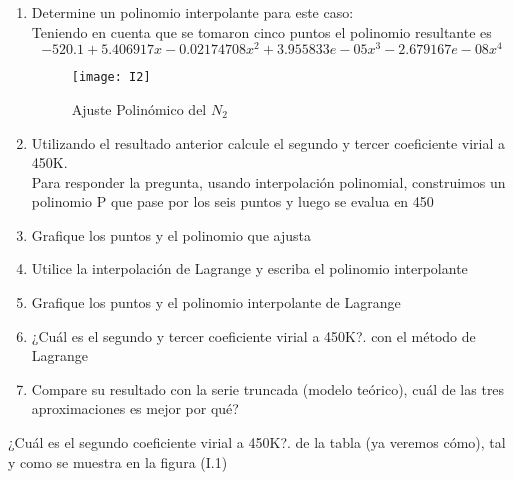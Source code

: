 \documentclass[12pt,letterpaper]{exam}
\begin{document}
\begin{enumerate}
\begin{enumerate}
	\item 
	Determine un polinomio interpolante para este caso:\\
	Teniendo en cuenta que se tomaron cinco puntos el polinomio resultante es
	\begin{equation}
	-520.1 + 5.406917x - 0.02174708x^{2} + 3.955833e-05x^{3} -  
	2.679167e-08x^{4} 
	\end{equation}
	\begin{center} 
		\begin{figure}[h]
			\centering%
			\texttt{[image: I2]}
			\caption{Ajuste Polinómico del $N_{2}$} 
		\end{figure}
	\end{center}
	\item
	Utilizando el resultado anterior calcule el segundo y tercer coeficiente virial a 450K.\\
	Para responder
	la pregunta, usando interpolación polinomial, construimos un
	polinomio P que pase por los seis puntos y luego se evalua en 450
	\item
	Grafique los puntos y el polinomio que ajusta
	\item
	Utilice la interpolación de Lagrange y escriba el polinomio interpolante 
	\item
	Grafique los puntos y el polinomio interpolante de Lagrange 
	\item
	¿Cuál es el segundo y tercer coeficiente virial a 450K?. con el método de Lagrange
	\item
	Compare su resultado con la serie truncada (modelo teórico), cuál de las tres aproximaciones es mejor por qué?
	
\end{enumerate}


¿Cuál es el segundo coeficiente virial a 450K?.  de la tabla (ya veremos
cómo), tal y como se muestra en la figura (I.1)
	
 
 
 
 

 
    
            
   
      
     
     	
 	 
  
  





 
 
 	
\end{enumerate}




	
\end{document}
